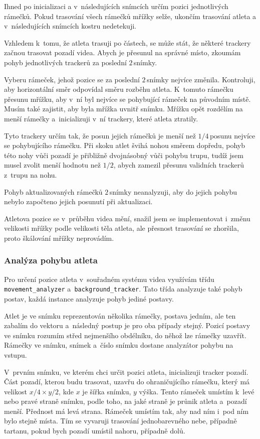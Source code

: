 Ihned po inicializaci a v~následujících snímcích určím pozici jednotlivých rámečků. Pokud trasování všech rámečků mřížky selže, ukončím trasování atleta a v~následujících snímcích kostru nedetekuji.

Vzhledem k~tomu, že atleta trasuji po částech, se může stát, že některé trackery začnou trasovat pozadí videa. Abych je přesunul na správné místo, zkoumám pohyb jednotlivých trackerů za poslední $2$\,\rm snímky.

Vyberu rámeček, jehož pozice se za poslední $2$\,\rm snímky nejvíce změnila. Kontroluji, aby horizontální směr odpovídal směru rozběhu atleta. K~tomuto rámečku přesunu mřížku, aby v~ní byl nejvíce se pohybující rámeček na původním místě. Musím také zajistit, aby byla mřížka uvnitř snímku. Mřížku opět rozdělím na menší rámečky a~inicializuji v~ní trackery, které atleta ztratily.

Tyto trackery určím tak, že posun jejich rámečků je menší než $1/4$\,\rm posunu nejvíce se pohybujícího rámečku. Při skoku atlet švihá nohou směrem dopředu, pohyb této nohy vůči pozadí je přibližně dvojnásobný vůči pohybu trupu, tudíž jsem musel zvolit menší hodnotu než $1/2$, abych zamezil přesunu validních trackerů z~trupu na nohu.

Pohyb aktualizovaných rámečků $2$\,\rm snímky neanalyzuji, aby do jejich pohybu nebylo započteno jejich posunutí při aktualizaci.

Atletova pozice se v~průběhu videa mění, snažil jsem se implementovat i~změnu velikosti mřížky podle velikosti těla atleta, ale přesnost trasování se zhoršila, proto škálování mřížky neprovádím.


\subsubsection{Analýza pohybu atleta}

Pro určení pozice atleta v~souřadném systému videa využívám třídu \texttt{movement\_analyzer} a~\texttt{background\_tracker}. Tato třída analyzuje také pohyb postav, každá instance analyzuje pohyb jediné postavy.

Atlet je ve snímku reprezentován několika rámečky, postava jedním, ale ten zabalím do vektoru a~následný postup je pro oba případy stejný. Pozicí postavy ve snímku rozumím střed nejmenšího obdélníku, do něhož lze rámečky uzavřít. Rámečky ve snímku, snímek a~číslo snímku dostane analyzátor pohybu na vstupu.

V~prvním snímku, ve kterém chci určit pozici atleta, inicializuji tracker pozadí. Část pozadí, kterou budu trasovat, uzavřu do ohraničujícího rámečku, který má velikost $x/4\times y/2$, kde $x$ je šířka snímku, $y$ výška. Tento rámeček umístím k~levé nebo pravé straně snímku, podle toho, na jaké straně je průnik atleta a~pozadí menší. Přednost má levá strana. Rámeček umístím tak, aby nad ním i~pod ním bylo stejně místa. Tím se vyvaruji trasování jednobarevného nebe, případně tartanu, pokud bych pozadí umístil nahoru, případně dolů.

